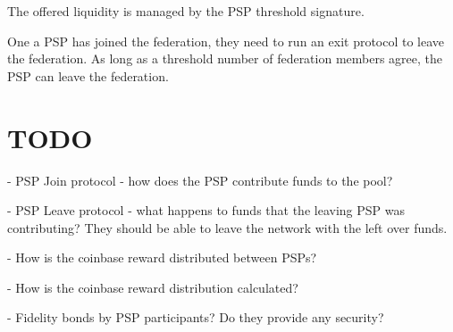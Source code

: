 \documentclass{article}
\begin{document}
The offered liquidity is managed by the PSP threshold signature.

One a PSP has joined the federation, they need to run an exit
  protocol to leave the federation. As long as a threshold number of
  federation members agree, the PSP can leave the federation.

  
\section{TODO}

- PSP Join protocol - how does the PSP contribute funds to the pool?

- PSP Leave protocol - what happens to funds that the leaving PSP was
contributing? They should be able to leave the network with the left
over funds.

- How is the coinbase reward distributed between PSPs?

- How is the coinbase reward distribution calculated?

- Fidelity bonds by PSP participants? Do they provide any security?


\end{document}

